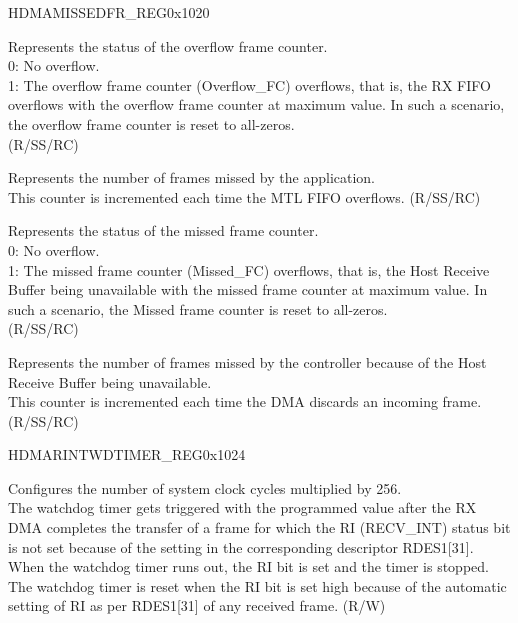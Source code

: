 \begin{register}{H}{DMAMISSEDFR\_REG}{0x1020}\label{regdesc:DMAMISSEDFRREG}
%
%
%
%
%
\regnewline%
\begin{regdesc}\begin{reglist}
\item [Overflow\_BFOC] Represents the status of the overflow frame counter.\\
0: No overflow.\\
1: The overflow frame counter (Overflow\_FC) overflows, that is, the RX FIFO overflows with the overflow frame counter at maximum value. In such a scenario, the overflow frame counter is reset to all-zeros.\\ (R/SS/RC)
\item [Overflow\_FC] Represents the number of frames missed by the application.\\
This counter is incremented each time the MTL FIFO overflows. (R/SS/RC)
\item [Overflow\_BMFC] Represents the status of the missed frame counter.\\
0: No overflow.\\
1: The missed frame counter (Missed\_FC) overflows, that is, the Host Receive Buffer being unavailable with the missed frame counter at maximum value. In such a scenario, the Missed frame counter is reset to all-zeros.\\
(R/SS/RC)
\item [Missed\_FC] Represents the number of frames missed by the controller because of the Host Receive Buffer being unavailable.\\
This counter is incremented each time the DMA discards an incoming frame. (R/SS/RC)
\end{reglist}\end{regdesc}
\end{register}

\begin{register}{H}{DMARINTWDTIMER\_REG}{0x1024}\label{regdesc:DMARINTWDTIMERREG}
%
%
\regnewline%
\begin{regdesc}\begin{reglist}
\item [RIWTC] Configures the number of system clock cycles multiplied by 256.\\
The watchdog timer gets triggered with the programmed value after the RX DMA completes the transfer of a frame for which the RI (RECV\_INT) status bit is not set because of the setting in the corresponding descriptor RDES1[31].\\
When the watchdog timer runs out, the RI bit is set and the timer is stopped. The watchdog timer is reset when the RI bit is set high because of the automatic setting of RI as per RDES1[31] of any received frame. (R/W)
\end{reglist}\end{regdesc}
\end{register}

